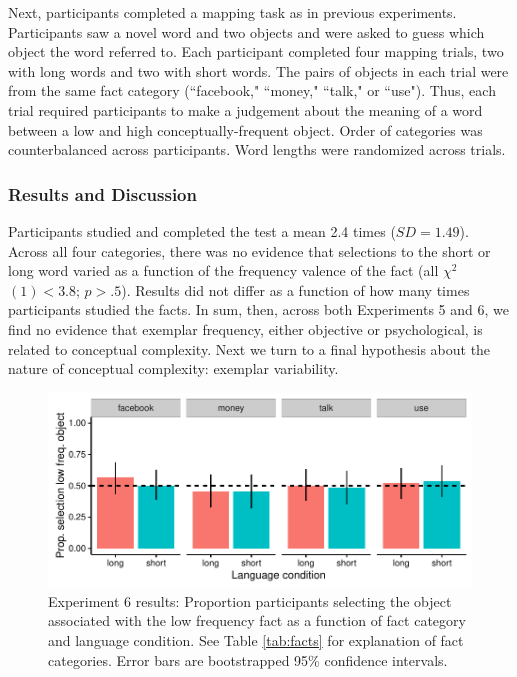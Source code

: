 Next, participants completed a mapping task as in previous experiments. Participants saw a novel word and two objects and were asked to guess which object the word referred to. Each participant completed four mapping trials, two with long words and two with short words. The pairs of objects in each trial were from the same fact category (``facebook," ``money," ``talk," or ``use"). Thus, each trial required participants to make a judgement about the meaning of a word between a low  and high conceptually-frequent object. Order of categories was counterbalanced across participants. Word lengths were randomized across trials. 

\subsubsection{Results and Discussion}
Participants studied and completed the test a mean 2.4 times ($SD = 1.49$).  Across all four categories, there was no evidence that selections to the short or long word varied as a function of the frequency valence of the fact (all ${\chi}^2$$(1) < 3.8$; $p > .5$). Results did not differ as a function of how many times participants studied the facts. In sum, then, across both Experiments 5 and 6, we find no evidence that exemplar frequency, either objective  or psychological, is related to conceptual complexity. Next we turn to a final hypothesis about the nature of conceptual complexity: exemplar variability.

  \begin{figure}[t!]
 \begin{center}
  \includegraphics[width=6in]{figs/fact_plots.pdf}
  \caption{\label{fig:fact_plots} Experiment 6 results: Proportion participants selecting the object associated with the low frequency fact as a function of fact category and language condition. See Table \ref{tab:facts} for explanation of fact categories. Error bars are bootstrapped 95\% confidence intervals.}
 \end{center}
\end{figure}

